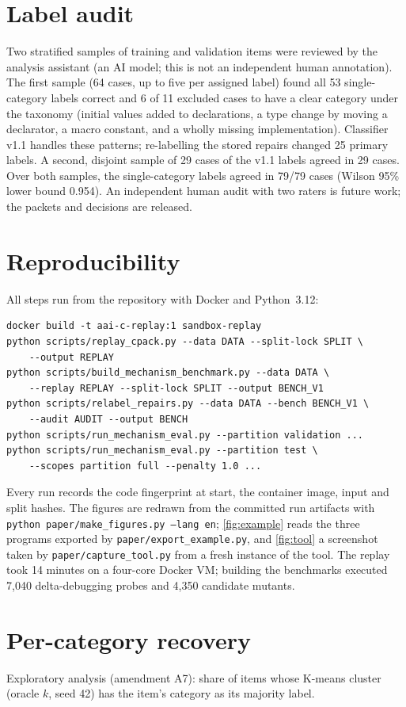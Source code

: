 \documentclass[a4paper,preprint,12pt,authoryear]{elsarticle}
\begin{document}
\section{Label audit}\label{app:audit}
Two stratified samples of training and validation items were reviewed by the analysis assistant (an AI model; this is not an independent human annotation). The first sample (64 cases, up to five per assigned label) found all 53 single-category labels correct and 6 of 11 excluded cases to have a clear category under the taxonomy (initial values added to declarations, a type change by moving a declarator, a macro constant, and a wholly missing implementation). Classifier v1.1 handles these patterns; re-labelling the stored repairs changed 25 primary labels. A second, disjoint sample of 29 cases of the v1.1 labels agreed in 29 cases. Over both samples, the single-category labels agreed in 79/79 cases (Wilson 95\% lower bound 0.954). An independent human audit with two raters is future work; the packets and decisions are released.

\section{Reproducibility}\label{app:repro}
All steps run from the repository with Docker and Python~3.12:
\begin{verbatim}
docker build -t aai-c-replay:1 sandbox-replay
python scripts/replay_cpack.py --data DATA --split-lock SPLIT \
    --output REPLAY
python scripts/build_mechanism_benchmark.py --data DATA \
    --replay REPLAY --split-lock SPLIT --output BENCH_V1
python scripts/relabel_repairs.py --data DATA --bench BENCH_V1 \
    --audit AUDIT --output BENCH
python scripts/run_mechanism_eval.py --partition validation ...
python scripts/run_mechanism_eval.py --partition test \
    --scopes partition full --penalty 1.0 ...
\end{verbatim}
Every run records the code fingerprint at start, the container image, input and split hashes. The figures are redrawn from the committed run artifacts with \texttt{python paper/make\_figures.py --lang en}; \cref{fig:example} reads the three programs exported by \texttt{paper/export\_example.py}, and \cref{fig:tool} a screenshot taken by \texttt{paper/capture\_tool.py} from a fresh instance of the tool. The replay took 14 minutes on a four-core Docker VM; building the benchmarks executed 7,040 delta-debugging probes and 4,350 candidate mutants.

\section{Per-category recovery}\label{app:categories}
Exploratory analysis (amendment A7): share of items whose K-means cluster (oracle $k$, seed 42) has the item's category as its majority label.
\end{document}
